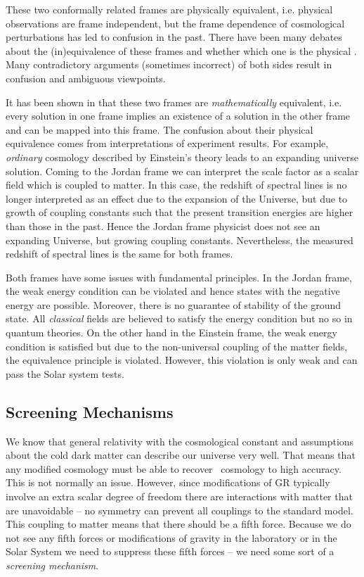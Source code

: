These two conformally related frames are physically equivalent, i.e. physical observations are frame independent, but the frame dependence of cosmological perturbations has led to confusion in the past. There have been many debates about the (in)equivalence of these frames \parencite{Postma:2014vaa} and whether which one is the physical \parencite{Faraoni:1999hp}. Many contradictory arguments (sometimes incorrect) of both sides result in confusion and ambiguous viewpoints.

It has been shown in \textcite{Magnano:1993bd} that these two frames are \textit{mathematically} equivalent, i.e. every solution in one frame implies an existence of a solution in the other frame and can be mapped into this frame. The confusion about their physical equivalence comes from interpretations of experiment results. For example, \textit{ordinary} cosmology described by Einstein’s theory leads to an expanding universe solution. Coming to the Jordan frame we can interpret the scale factor as a scalar field which is coupled to matter. In this case, the redshift of spectral lines is no longer interpreted as an effect due to the expansion of the Universe, but due to growth of coupling constants such that the present transition energies are higher than those in the past. Hence the Jordan frame physicist does not see an expanding Universe, but growing coupling constants. Nevertheless, the measured redshift of spectral lines is the same for both frames.

Both frames have some issues with fundamental principles. In the Jordan frame, the weak energy condition can be violated and hence states with the negative energy are possible. Moreover, there is no guarantee of stability of the ground state. All \textit{classical} fields are believed to satisfy the energy condition but no so in quantum theories. On the other hand in the Einstein frame, the weak energy condition is satisfied but due to the non-universal coupling of the matter fields, the equivalence principle is violated. However, this violation is only weak and can pass the Solar system tests.

\subsection{Screening Mechanisms}
We know that general relativity with the cosmological constant and assumptions about the cold dark matter can describe our universe very well. That means that any modified cosmology must be able to recover \LCDM\ cosmology to high accuracy. This is not normally an issue. However, since modifications of GR typically involve an extra scalar degree of freedom there are interactions with matter that are unavoidable -- no symmetry can prevent all couplings to the standard model. This coupling to matter means that there should be a fifth force. Because we do not see any fifth forces or modifications of gravity in the laboratory or in the Solar System we need to suppress these fifth forces -- we need some sort of a \textit{screening mechanism}.

